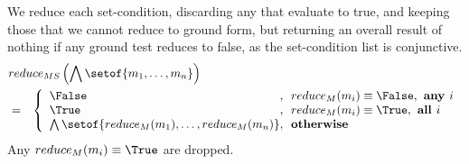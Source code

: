 We reduce each set-condition,
discarding any that evaluate to true,
and keeping those that we cannot reduce to ground form,
but returning an overall result of nothing
if any ground test reduces to false,
as the set-condition list is conjunctive.
\begin{eqnarray*}
  \lefteqn{reduce_{MS}\left(\bigwedge\setof{m_1,\ldots,m_n}\right)}
\\&=&
  \left\{\begin{array}{l@{,~~}l}
    \False & reduce_M(m_i) \equiv \False, \textbf{ any } i \\
    \True & reduce_M(m_i) \equiv \True, \textbf{ all } i \\
    \bigwedge\setof{reduce_M(m_1),\ldots,reduce_M(m_n)} & \textbf{otherwise}
  \end{array}\right.
\end{eqnarray*} 
Any $reduce_M(m_i) \equiv \True$ are dropped.